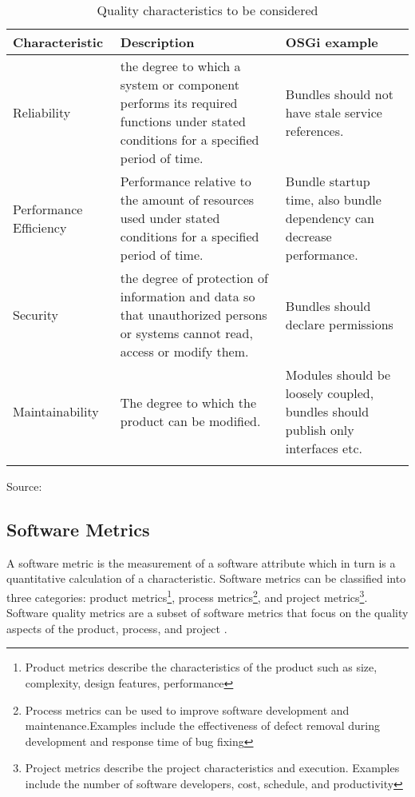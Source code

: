 \begin{table}[h]
\caption{Quality characteristics to be considered}
\begin{center}
    \begin{tabular}{  p{3cm} | p{8cm} | p{5cm} }
    \Xhline{2\arrayrulewidth}
    Characteristic & Description & OSGi example \\  \hline
    Reliability & the degree to which a system or component performs its required functions under stated conditions for a specified period of time. & Bundles should not have stale service references.\\ \hline
    Performance Efficiency & Performance relative to the amount of resources used under stated conditions for a specified
period of time. & Bundle startup time, also bundle dependency can decrease performance. \\ \hline
    Security & the degree of protection of information and data so that unauthorized persons or systems cannot read, access or modify them. & Bundles should declare permissions \\ \hline
    Maintainability & The degree to which the product can be modified. & Modules should be loosely coupled, bundles should publish only interfaces etc. \\ 
    \Xhline{2\arrayrulewidth}
     
    \end{tabular}
    Source: \cite{cisq 2012}
\end{center}
\end{table}
\FloatBarrier

\subsection{Software Metrics}
\label{sec:soft_metrics}
A software metric is the measurement of a software attribute which in turn is a quantitative calculation of a characteristic. Software metrics can be classified into three categories: product metrics\footnote{Product metrics describe the characteristics of the product such as size, complexity, design features, performance}, process metrics\footnote{Process metrics can be used to improve software development and maintenance.Examples include the effectiveness of defect removal during development and response time of bug fixing}, and project metrics\footnote{Project metrics describe the project characteristics and execution. Examples include the number of
software developers, cost, schedule, and productivity}. Software quality metrics are a subset of software metrics that focus on the quality aspects of the product, process, and project \citep{Kan 2002}.


